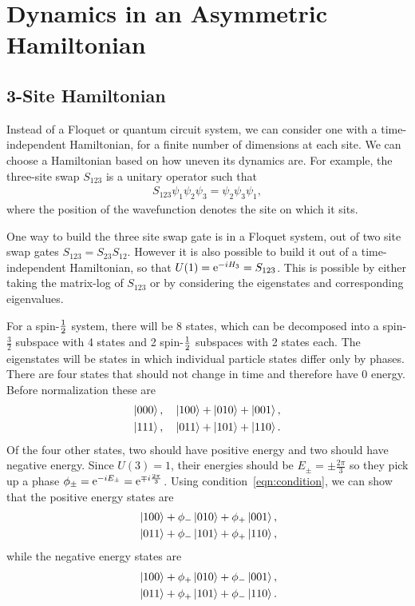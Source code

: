 \section{Dynamics in an Asymmetric Hamiltonian} \label{sec:asymham}

\subsection{3-Site Hamiltonian} \emph{} \label{sub:hamiltonian}

Instead of a Floquet or quantum circuit system, we can consider one with a time-independent Hamiltonian, for a finite number of dimensions at each site. We can choose a Hamiltonian based on how uneven its dynamics are. For example, the three-site swap $S_{123}$ is a unitary operator such that 
\begin{align}
S_{123}\psi_1\psi_2\psi_3 =\psi_2\psi_3\psi_1, \label{eqn:condition}
\end{align}
where the position of the wavefunction denotes the site on which it sits. 

One way to build the three site swap gate is in a Floquet system, out of two site swap gates $S_{123} = S_{23}S_{12}$. However it is also possible to build it out of a time-independent Hamiltonian, so that $U(1) = \text{e}^{-iH_3} = S_{123}$. This is possible by either taking the matrix-log of $S_{123}$ or by considering the eigenstates and corresponding eigenvalues. 

For a spin-$\frac{1}{2}$ system, there will be 8 states, which can be decomposed into a spin-$\frac{3}{2}$ subspace with 4 states and 2 spin-$\frac{1}{2}$ subspaces with 2 states each. The eigenstates will be states in which individual particle states differ only by phases. There are four states that should not change in time and therefore have 0 energy. Before normalization these are
\begin{align}
\left|000\right\rangle,\quad \left|100\right\rangle+\left|010\right\rangle+\left|001\right\rangle,\nonumber\\
\left|111\right\rangle,\quad \left|011\right\rangle+\left|101\right\rangle+\left|110\right\rangle.\label{eqn:zero}
\end{align}
Of the four other states, two should have positive energy and two should have negative energy. Since $U(3)=1$, their energies should be $E_\pm = \pm\frac{2\pi}{3}$ so they pick up a phase $\phi_\pm =\text{e}^{-iE_\pm} = \text{e}^{\mp i\frac{2\pi}{3}}$. Using condition~\ref{eqn:condition}, we can show that the positive energy states are
\begin{align}
&\left|100\right\rangle + \phi_-\left|010\right\rangle + \phi_+\left|001\right\rangle,\nonumber\\
&\left|011\right\rangle + \phi_-\left|101\right\rangle + \phi_+\left|110\right\rangle,\label{eqn:plus}
\end{align}
while the negative energy states are 
\begin{align}
&\left|100\right\rangle + \phi_+\left|010\right\rangle + \phi_-\left|001\right\rangle,\nonumber\\
&\left|011\right\rangle + \phi_+\left|101\right\rangle + \phi_-\left|110\right\rangle.\label{eqn:minus}
\end{align}

